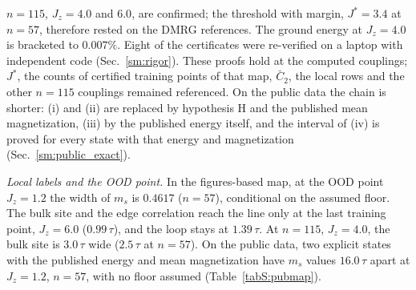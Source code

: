 \documentclass[aps,prx,onecolumn,10pt,nofootinbib,longbibliography,floatfix]{revtex4-2}
\theoremstyle{remark}
\newcommand{\Jz}{J_z}
\newcommand{\ms}{m_s}
\newcommand{\Ctwo}{\bar C_{2}}
\begin{document}
$n=115$, $\Jz=4.0$ and $6.0$, are confirmed; the threshold with margin, $J^*=3.4$ at $n=57$, therefore rested on the
DMRG references. The ground energy at $\Jz=4.0$ is bracketed to $0.007\%$. Eight of the %
certificates were re-verified on a laptop with independent code (Sec.~\ref{sm:rigor}). These proofs hold at the
computed couplings; $J^*$, the counts of certified training points of that map, $\Ctwo$, the local rows and the other $n=115$
couplings remained referenced. On the public data the chain is shorter: (i) and (ii) are replaced by hypothesis H
and the published mean magnetization, (iii) by the published energy itself, and the interval of (iv) is proved for
every state with that energy and magnetization (Sec.~\ref{sm:public_exact}).

\emph{Local labels and the OOD point.} In the figures-based map, at the OOD point $\Jz=1.2$ the width of $\ms$ is $0.4617$ ($n=57$), %
conditional on the assumed floor. The bulk site and the edge correlation reach the line only at the last training point,
$\Jz=6.0$ ($0.99\,\tau$), and the loop stays at $1.39\,\tau$. At $n=115$, $\Jz=4.0$, the bulk site is $3.0\,\tau$ wide %
($2.5\,\tau$ at $n=57$). On the public data, two explicit states with the published energy and mean magnetization %
have $\ms$ values $16.0\,\tau$ apart at $\Jz=1.2$, $n=57$, with no floor assumed (Table~\ref{tabS:pubmap}). %
\end{document}
